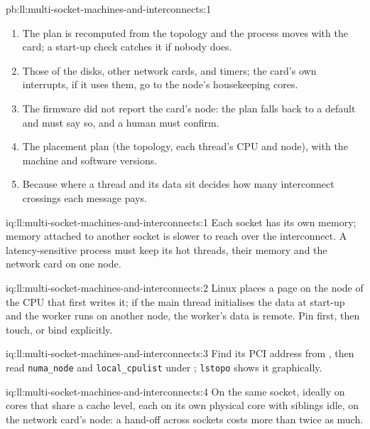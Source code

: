 \begin{solution}{pb:ll:multi-socket-machines-and-interconnects:1}
\begin{enumerate}
region's node () and compare with the plan.
\item The plan is recomputed from the topology and the process moves with the card; a start-up check catches it if nobody
does.
\item Those of the disks, other network cards, and timers; the card's own interrupts, if it uses them, go to the node's
housekeeping cores.
\item The firmware did not report the card's node: the plan falls back to a default and must say so, and a human must
confirm.
\item The placement plan (the topology, each thread's CPU and node), with the machine and software versions.
\item Because where a thread and its data sit decides how many interconnect crossings each message pays.
\end{enumerate}
\end{solution}

\begin{solution}{iq:ll:multi-socket-machines-and-interconnects:1}
Each socket has its own memory; memory attached to another socket is slower to reach over the interconnect. A
latency-sensitive process must keep its hot threads, their memory and the network card on one node.
\end{solution}

\begin{solution}{iq:ll:multi-socket-machines-and-interconnects:2}
Linux places a page on the node of the CPU that first writes it; if the main thread initialises the data at start-up and
the worker runs on another node, the worker's data is remote. Pin first, then touch, or bind explicitly.
\end{solution}

\begin{solution}{iq:ll:multi-socket-machines-and-interconnects:3}
Find its PCI address from , then read \texttt{numa\_node} and \texttt{local\_cpulist}
under ; \texttt{lstopo} shows it graphically.
\end{solution}

\begin{solution}{iq:ll:multi-socket-machines-and-interconnects:4}
On the same socket, ideally on cores that share a cache level, each on its own physical core with siblings idle, on the
network card's node: a hand-off across sockets costs more than twice as much.
\end{solution}

